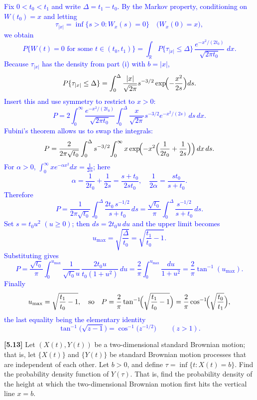 \documentclass{article}
\begin{document}
\begin{enumerate}
        \textcolor{blue}{
Fix $0<t_0<t_1$ and write $\Delta=t_1-t_0$.  By the Markov property, conditioning on $W(t_0)=x$ and letting  
$$
\tau_{|x|}=\inf\{s>0:W_{x}(s)=0\}\quad\bigl(W_{x}(0)=x\bigr),
$$
we obtain  
$$
P\{W(t)=0\text{ for some }t\in(t_0,t_1)\}
  =\int_{\mathbb R}P\{\tau_{|x|}\le\Delta\}\,
           \frac{e^{-x^{2}/(2t_0)}}{\sqrt{2\pi t_0}}\;dx .
$$
Because $\tau_{|x|}$ has the density from part (i) with $b=|x|$,
$$
P\{\tau_{|x|}\le\Delta\}=\int_{0}^{\Delta}\frac{|x|}{\sqrt{2\pi}}s^{-3/2}
                                   \exp\!\Bigl(-\frac{x^{2}}{2s}\Bigr)ds .
$$
Insert this and use symmetry to restrict to $x>0$:
$$
P = 2\int_{0}^{\infty}\frac{e^{-x^{2}/(2t_0)}}{\sqrt{2\pi t_0}}
         \int_{0}^{\Delta}\frac{x}{\sqrt{2\pi}}s^{-3/2}
               e^{-x^{2}/(2s)}\,ds\,dx .
$$
Fubini’s theorem allows us to swap the integrals:
$$
P=\frac{2}{2\pi\sqrt{t_0}}
    \int_{0}^{\Delta}s^{-3/2}\!
      \int_{0}^{\infty}x\exp\!\Bigl(-x^{2}\Bigl(\frac1{2t_0}+\frac1{2s}\Bigr)\Bigr)\,dx\,ds .
$$
For $\alpha>0$, $\int_{0}^{\infty}x e^{-\alpha x^{2}}dx=\frac1{2\alpha}$; here  
$$
\alpha=\frac1{2t_0}+\frac1{2s}=\frac{s+t_0}{2st_0},
\quad
\frac1{2\alpha}=\frac{st_0}{s+t_0}.
$$
Therefore  
$$
P=\frac1{2\pi\sqrt{t_0}}
      \int_{0}^{\Delta}\frac{2t_0\,s^{-1/2}}{s+t_0}\,ds
  =\frac{\sqrt{t_0}}{\pi}\int_{0}^{\Delta}\!\frac{s^{-1/2}}{s+t_0}\,ds .
$$
Set $s=t_0u^{2}$ $(u\ge0)$; then $ds=2t_0u\,du$ and the upper limit becomes  
$$
u_{\max}=\sqrt{\frac{\Delta}{t_0}}=\sqrt{\frac{t_1}{t_0}-1}.
$$
Substituting gives
$$
P=\frac{\sqrt{t_0}}{\pi}\int_{0}^{u_{\max}}
       \frac{1}{\sqrt{t_0}u}\,\frac{2t_0u}{t_0(1+u^{2})}\,du
  =\frac{2}{\pi}\int_{0}^{u_{\max}}\frac{du}{1+u^{2}}
  =\frac{2}{\pi}\tan^{-1}(u_{\max}).
$$
Finally
$$
u_{\max}=\sqrt{\frac{t_1}{t_0}-1},
\quad
\text{so}\quad
P=\frac{2}{\pi}\tan^{-1}\!\Bigl(\sqrt{\frac{t_1}{t_0}-1}\Bigr)
  =\frac{2}{\pi}\cos^{-1}\!\Bigl(\sqrt{\frac{t_0}{t_1}}\Bigr),
$$
the last equality being the elementary identity
$$
\tan^{-1}\!\bigl(\sqrt{z-1}\bigr)=\cos^{-1}\!\bigl(z^{-1/2}\bigr)\qquad(z>1).
$$
        }

\end{enumerate}



\textbf{[5.13]} Let $(X(t), Y(t))$ be a two-dimensional standard Brownian motion; that is, let $\{X(t)\}$ and $\{Y(t)\}$ be standard Brownian motion processes that are independent of each other. Let $b > 0$, and define $\tau = \inf\{t : X(t) = b\}$. Find the probability density function of $Y(\tau)$. That is, find the probability density of the height at which the two-dimensional Brownian motion first hits the vertical line $x = b$.
\end{document}
